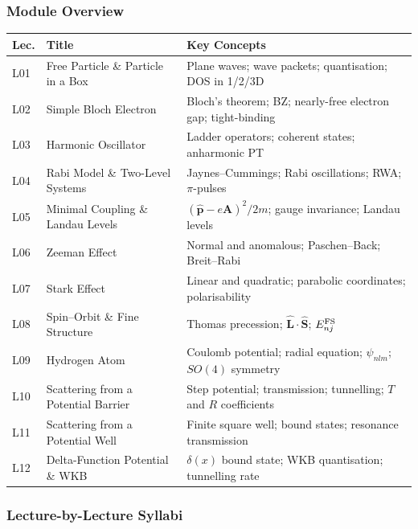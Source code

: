 \documentclass[11pt,a4paper]{article}
\begin{document}
\subsubsection*{Module Overview}
{\footnotesize
\begin{center}
\begin{tabular}{@{}lp{4.2cm}p{6.8cm}@{}}
\toprule
\textbf{Lec.} & \textbf{Title} & \textbf{Key Concepts}\\
\midrule
L01 & Free Particle \& Particle in a Box & Plane waves; wave packets; quantisation; DOS in 1/2/3D\\
L02 & Simple Bloch Electron & Bloch's theorem; BZ; nearly-free electron gap; tight-binding\\
L03 & Harmonic Oscillator & Ladder operators; coherent states; anharmonic PT\\
L04 & Rabi Model \& Two-Level Systems & Jaynes--Cummings; Rabi oscillations; RWA; $\pi$-pulses\\
L05 & Minimal Coupling \& Landau Levels & $(\hat{\mathbf{p}}-e\mathbf{A})^2/2m$; gauge invariance; Landau levels\\
L06 & Zeeman Effect & Normal and anomalous; Paschen--Back; Breit--Rabi\\
\midrule
L07 & Stark Effect & Linear and quadratic; parabolic coordinates; polarisability\\
L08 & Spin--Orbit \& Fine Structure & Thomas precession; $\hat{\mathbf{L}}\cdot\hat{\mathbf{S}}$; $E_{nj}^{\rm FS}$\\
L09 & Hydrogen Atom & Coulomb potential; radial equation; $\psi_{nlm}$; $SO(4)$ symmetry\\
L10 & Scattering from a Potential Barrier & Step potential; transmission; tunnelling; $T$ and $R$ coefficients\\
L11 & Scattering from a Potential Well & Finite square well; bound states; resonance transmission\\
L12 & Delta-Function Potential \& WKB & $\delta(x)$ bound state; WKB quantisation; tunnelling rate\\
\bottomrule
\end{tabular}
\end{center}
}

\subsubsection*{Lecture-by-Lecture Syllabi}
\end{document}

